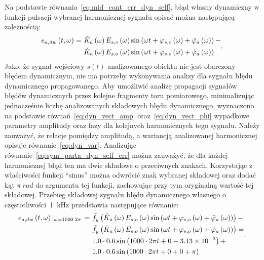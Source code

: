 Na podstawie równania~\eqref{eq:mid_cont_err_dyn_self}, błąd własny dynamiczny w funkcji pulsacji wybranej harmonicznej sygnału opisać można następującą zależnością:
\begin{equation}
\begin{split}
e_{a,dw} \left(t,\omega\right) =~
& \tilde{K}_{a} \left(\omega\right) E_{s,o} \left(\omega\right) \sin \left( \omega t + \varphi_{s,o} \left(\omega\right) + \tilde{\varphi}_{a} \left(\omega\right) \right) - \\
& \dot{K}_{a} \left(\omega\right) E_{s,o} \left(\omega\right) \sin \left( \omega t + \varphi_{s,o} \left(\omega\right) + \dot{\varphi}_{a} \left(\omega\right) \right)
\end{split}
\label{eq:sym_parta_dyn_self_err}.
\end{equation}
Jako, że sygnał wejściowy $s(t)$ analizowanego obiektu nie jest obarczony błędem dynamicznym, nie ma potrzeby wykonywania analizy dla sygnału błędu dynamicznego propagowanego. Aby umożliwić analizę propagacji sygnałów błędów dynamicznych przez kolejne fragmenty toru pomiarowego, minimalizując jednocześnie liczbę analizowanych składowych błędu dynamicznego, wyznaczono na podstawie równań~\eqref{eq:dyn_vect_amp} oraz~\eqref{eq:dyn_vect_phi} wypadkowe parametry amplitudy oraz fazy dla kolejnych harmonicznych tego sygnału. Należy zauważyć, że relacje pomiędzy amplitudą, a wariancją analizowanej harmonicznej opisuje równanie~\eqref{eq:dyn_var}. Analizując równanie~\eqref{eq:sym_parta_dyn_self_err} można zauważyć, że dla każdej harmonicznej błąd ten ma dwie składowe o przeciwnych znakach. Korzystając z właściwości funkcji \enquote{sinus} można odwrócić znak wybranej składowej oraz dodać kąt $\pi~\unit{rad}$ do argumentu tej funkcji, zachowując przy tym oryginalną wartość tej składowej. Przebieg składowej sygnału błędu dynamicznego własnego o częstotliwości~\qty{1}{kHz} przedstawia następujące równanie:
\begin{equation}
\begin{split}
e_{a,dw} \left(t,\omega\right) \left|_{\omega = 1000 \cdot 2 \pi } \right. =~
& \tilde{f}_{y} \left(\tilde{K}_{a} \left(\omega\right) E_{s,o} \left(\omega\right) \sin \left( \omega t + \varphi_{s,o} \left(\omega\right) + \tilde{\varphi}_{a} \left(\omega\right) \right)\right) - \\
& \tilde{f}_{y} \left(\dot{K}_{a} \left(\omega\right) E_{s,o} \left(\omega\right) \sin \left( \omega t + \varphi_{s,o} \left(\omega\right) + \dot{\varphi}_{a} \left(\omega\right) \right)\right) = \\
& 1.0 \cdot 0.6 \sin \left( 1000 \cdot 2 \pi t + 0 - \num{3.13e-3} \right) + \\
& 1.0 \cdot 0.6 \sin \left( 1000 \cdot 2 \pi t + 0 + 0 + \pi \right)
\end{split}
\label{eq:sym_parta_dyn_self_example_harm}.
\end{equation}

